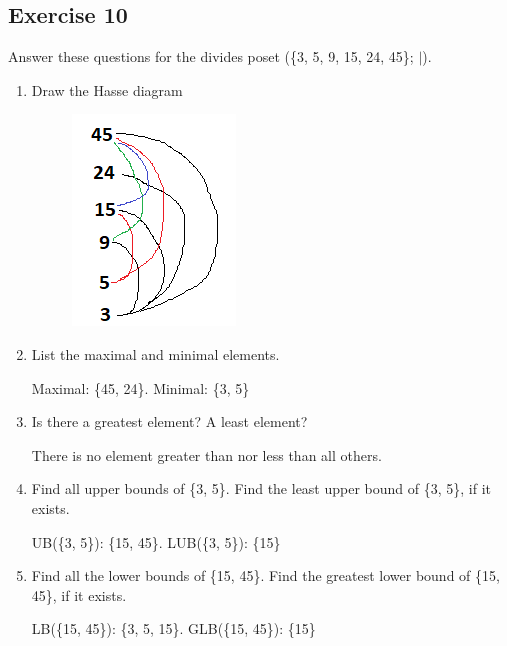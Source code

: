 \documentclass{article}
\newcommand\ssc[2][\DefaultOpt]{%
  \def\DefaultOpt{#2}%
  \subsection[#1]{#2}%
}
\newcommand{\balist}{\begin{enumerate}[label=\alph*.]}
\newcommand{\elist}{\end{enumerate}}
\newcommand{\bk}[1]{\{#1\}}
\newcommand\tab[1][1cm]{\hspace*{#1}}
\begin{document}
\ssc{Exercise 10}{

Answer these questions for the divides poset (\bk{3, 5, 9, 15, 24, 45}; $\mid$).
\balist

\item Draw the Hasse diagram

\begin{figure}[hbt]
  \includegraphics{admhw3ex10a.png}
\end{figure}

\item List the maximal and minimal elements.

Maximal: \bk{45, 24}. \tab Minimal: \bk{3, 5}

\item Is there a greatest element? A least element?

There is no element greater than nor less than all others.

\item Find all upper bounds of \bk{3, 5}. Find the least upper bound of \bk{3, 5}, if it exists.

UB(\bk{3, 5}): \bk{15, 45}. \tab LUB(\bk{3, 5}): \bk{15}

\item Find all the lower bounds of \bk{15, 45}. Find the greatest lower bound of \bk{15, 45}, if it exists.

LB(\bk{15, 45}): \bk{3, 5, 15}. \tab GLB(\bk{15, 45}): \bk{15}

\elist

}
\end{document}
